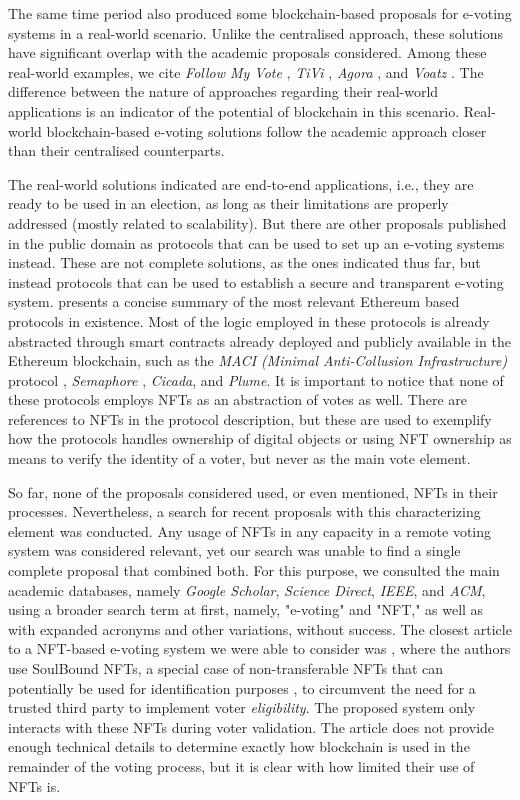 \documentclass[../main.tex]{subfiles}
\begin{document}
\par
The same time period also produced some blockchain-based proposals for e-voting systems in a real-world scenario. Unlike the centralised approach, these solutions have significant overlap with the academic proposals considered. Among these real-world examples, we cite \textit{Follow My Vote} \cite{Ernest2021}, \textit{TiVi} \cite{TiVi2021}, \textit{Agora} \cite{AgoraWhitePaper2021}, and \textit{Voatz} \cite{Voatz2021}. The difference between the nature of approaches regarding their real-world applications is an indicator of the potential of blockchain in this scenario. Real-world blockchain-based e-voting solutions follow the academic approach closer than their centralised counterparts.
\par
The real-world solutions indicated are end-to-end applications, i.e., they are ready to be used in an election, as long as their limitations are properly addressed (mostly related to scalability). But there are other proposals published in the public domain as protocols that can be used to set up an e-voting systems instead. These are not complete solutions, as the ones indicated thus far, but instead protocols that can be used to establish a secure and transparent e-voting system. \cite{Lamtzidis2023} presents a concise summary of the most relevant Ethereum based protocols in existence. Most of the logic employed in these protocols is already abstracted through smart contracts already deployed and publicly available in the Ethereum blockchain, such as the \textit{MACI (Minimal Anti-Collusion Infrastructure)} protocol \cite{MACI2024}, \textit{Semaphore} \cite{Semaphore2024}, \textit{Cicada}, and \textit{Plume}. It is important to notice that none of these protocols employs NFTs as an abstraction of votes as well. There are references to NFTs in the protocol description, but these are used to exemplify how the protocols handles ownership of digital objects or using NFT ownership as means to verify the identity of a voter, but never as the main vote element.
\par
So far, none of the proposals considered used, or even mentioned, NFTs in their processes. Nevertheless, a search for recent proposals with this characterizing element was conducted. Any usage of NFTs in any capacity in a remote voting system was considered relevant, yet our search was unable to find a single complete proposal that combined both. For this purpose, we consulted the main academic databases, namely \textit{Google Scholar}, \textit{Science Direct}, \textit{IEEE}, and \textit{ACM}, using a broader search term at first, namely, "e-voting" and "NFT," as well as with expanded acronyms and other variations, without success. The closest article to a NFT-based e-voting system we were able to consider was \cite{Sagar2023}, where the authors use SoulBound NFTs, a special case of non-transferable NFTs that can potentially be used for identification purposes \cite{Weyl2022}, to circumvent the need for a trusted third party to implement voter \textit{eligibility}. The proposed system only interacts with these NFTs during voter validation. The article does not provide enough technical details to determine exactly how blockchain is used in the remainder of the voting process, but it is clear with how limited their use of NFTs is.
\end{document}
